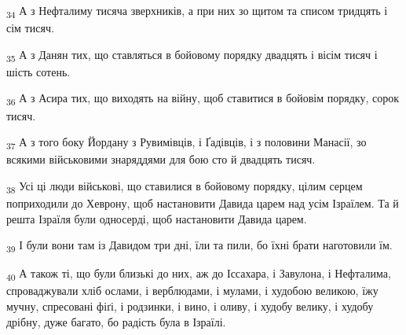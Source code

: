 \begin{tcolorbox}
\textsubscript{34} А з Нефталиму тисяча зверхників, а при них зо щитом та списом тридцять і сім тисяч.
\end{tcolorbox}
\begin{tcolorbox}
\textsubscript{35} А з Данян тих, що ставляться в бойовому порядку двадцять і вісім тисяч і шість сотень.
\end{tcolorbox}
\begin{tcolorbox}
\textsubscript{36} А з Асира тих, що виходять на війну, щоб ставитися в бойовім порядку, сорок тисяч.
\end{tcolorbox}
\begin{tcolorbox}
\textsubscript{37} А з того боку Йордану з Рувимівців, і Ґадівців, і з половини Манасії, зо всякими військовими знаряддями для бою сто й двадцять тисяч.
\end{tcolorbox}
\begin{tcolorbox}
\textsubscript{38} Усі ці люди військові, що ставилися в бойовому порядку, цілим серцем поприходили до Хеврону, щоб настановити Давида царем над усім Ізраїлем. Та й решта Ізраїля були односерді, щоб настановити Давида царем.
\end{tcolorbox}
\begin{tcolorbox}
\textsubscript{39} І були вони там із Давидом три дні, їли та пили, бо їхні брати наготовили їм.
\end{tcolorbox}
\begin{tcolorbox}
\textsubscript{40} А також ті, що були близькі до них, аж до Іссахара, і Завулона, і Нефталима, спроваджували хліб ослами, і верблюдами, і мулами, і худобою великою, їжу мучну, спресовані фіґі, і родзинки, і вино, і оливу, і худобу велику, і худобу дрібну, дуже багато, бо радість була в Ізраїлі.
\end{tcolorbox}
